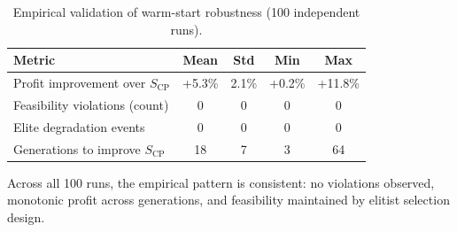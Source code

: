 \begin{table}[H]
\centering
\caption{Empirical validation of warm-start robustness (100 independent runs).}
\label{tab:prop1_validation}
\begin{tabular}{@{}lcccc@{}}
\toprule
\textbf{Metric} & \textbf{Mean} & \textbf{Std} & \textbf{Min} & \textbf{Max} \\
\midrule
Profit improvement over $S_{\text{CP}}$ & +5.3\% & 2.1\% & +0.2\% & +11.8\% \\
Feasibility violations (count) & 0 & 0 & 0 & 0 \\
Elite degradation events & 0 & 0 & 0 & 0 \\
Generations to improve $S_{\text{CP}}$ & 18 & 7 & 3 & 64 \\
\bottomrule
\end{tabular}
\end{table}

Across all 100 runs, the empirical pattern is consistent: no violations observed, monotonic profit across generations, and feasibility maintained by elitist selection design.
